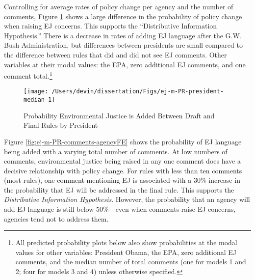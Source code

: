\documentclass[
      12pt,
        ]{article}
\begin{document}
Controlling for average rates of policy change per agency and the number of comments, Figure \ref{fig:ej-m-PR-president-median-1} shows a large difference in the probability of policy change when raising EJ concerns. This supports the ``Distributive Information Hypothesis.'' There is a decrease in rates of adding EJ language after the G.W. Bush Administration, but differences between presidents are small compared to the difference between rules that did and did not see EJ comments. Other variables at their modal values: the EPA, zero additional EJ comments, and one comment total.\footnote{All predicted probability plots below also show probabilities at the modal values for other variables: President Obama, the EPA, zero additional EJ comments, and the median number of total comments (one for models 1 and 2; four for models 3 and 4) unless otherwise specified.}

\begin{figure}

{\centering \texttt{[image: /Users/devin/dissertation/Figs/ej-m-PR-president-median-1]} 

}

\caption{Probability Environmental Justice is Added Between Draft and Final Rules by President}\label{fig:ej-m-PR-president-median-1}
\end{figure}

Figure \ref{fig:ej-m-PR-comments-agencyFE} shows the probability of EJ language being added with a varying total number of comments.
At low numbers of comments, environmental justice being raised in any one comment does have a decisive relationship with policy change. For rules with less than ten comments (most rules), one comment mentioning EJ is associated with a 30\% increase in the probability that EJ will be addressed in the final rule. This supports the \emph{Distributive Information Hypothesis}. However,
the probability that an agency will add EJ language is still below 50\%---even when comments raise EJ concerns, agencies tend not to address them.
\end{document}
